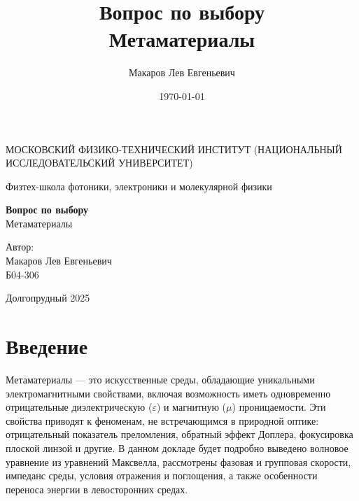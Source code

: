 \documentclass[a4paper,12pt]{article}
\author{Макаров Лев Евгеньевич}
\title{Вопрос по выбору\\
Метаматериалы}
\date{\today}
\begin{document}
\begin{titlepage}
	\begin{center}
		{\large МОСКОВСКИЙ ФИЗИКО-ТЕХНИЧЕСКИЙ ИНСТИТУТ (НАЦИОНАЛЬНЫЙ ИССЛЕДОВАТЕЛЬСКИЙ УНИВЕРСИТЕТ)}
	\end{center}
	\begin{center}
		{\large Физтех-школа фотоники, электроники и молекулярной физики}
	\end{center}
	
	
	\vspace{4.5cm}
	{\huge
		\begin{center}
			{\bf Вопрос по выбору}\\
			Метаматериалы
		\end{center}
	}
	\vspace{2cm}
	\begin{flushright}
		{\LARGE Автор:\\ Макаров Лев Евгеньевич \\
			\vspace{0.2cm}
			Б04-306}
	\end{flushright}
	\vspace{8cm}
	\begin{center}
		Долгопрудный 2025
	\end{center}
\end{titlepage}

\section{Введение}
Метаматериалы — это искусственные среды, обладающие уникальными электромагнитными свойствами, включая возможность иметь одновременно отрицательные диэлектрическую ($\varepsilon$) и магнитную ($\mu$) проницаемости. Эти свойства приводят к феноменам, не встречающимся в природной оптике: отрицательный показатель преломления, обратный эффект Доплера, фокусировка плоской линзой и другие. В данном докладе будет подробно выведено волновое уравнение из уравнений Максвелла, рассмотрены фазовая и групповая скорости, импеданс среды, условия отражения и поглощения, а также особенности переноса энергии в левосторонних средах.
\end{document}
